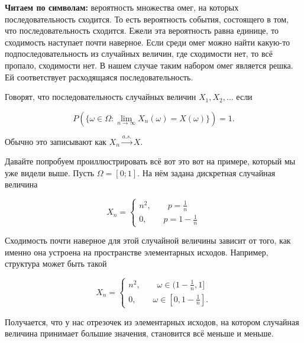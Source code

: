 \documentclass[12pt, a4paper, oneside]{article}
\begin{document}
\textbf{Читаем по символам:} вероятность множества омег, на которых последовательность сходится. То есть вероятность события, состоящего в том, что последовательность сходится. Ежели эта вероятность равна единице, то сходимость наступает почти наверное. Если среди омег можно найти какую-то подпоследовательность из случайных величин, где сходимости нет, то всё пропало, сходимости нет. В нашем случае таким набором омег является решка. Ей соответствует расходящаяся последовательность. 

\begin{definition}
Говорят, что последовательность случайных величин $X_1, X_2, \ldots$  если 

$$ P(\{\omega \in \Omega : \lim_{n \to \infty} X_n(\omega) = X(\omega)\}) = 1.$$

Обычно это записывают как $X_n \overset{a.s.}{\to} X.$
\end{definition}


Давайте попробуем проиллюстрировать всё вот это вот на примере, который мы уже видели выше. Пусть $\Omega = [0;1]$. На нём задана дискретная случайная величина

$$
X_n = \begin{cases} n^2, \qquad p = \frac{1}{n} \\ 0, \qquad p = 1 - \frac{1}{n} \end{cases} 
$$

Сходимость почти наверное для этой случайной величины зависит от того, как именно она устроена на пространстве элементарных исходов. Например, структура может быть такой

$$
X_n = \begin{cases} n^2, \qquad \omega \in (1-\frac{1}{n}, 1] \\ 0, \qquad \omega \in [0, 1 - \frac{1}{n}]. \end{cases} 
$$

Получается, что у нас отрезочек из элементарных исходов, на котором случайная величина принимает большие значения, становится всё меньше и меньше.
\end{document}
